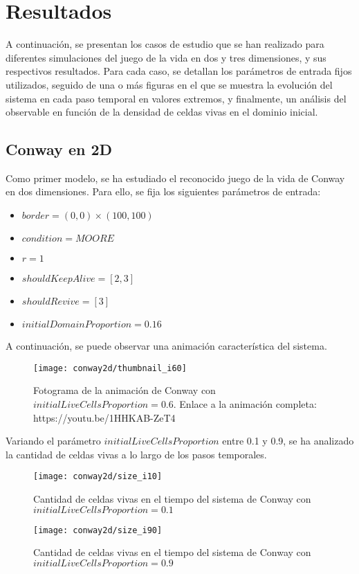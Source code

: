 \section{Resultados}\label{sec:resultados}
A continuación, se presentan los casos de estudio que se han realizado para diferentes simulaciones del juego
de la vida en dos y tres dimensiones, y sus respectivos resultados.
Para cada caso, se detallan los parámetros de entrada fijos utilizados, seguido de una o más figuras en el que
se muestra la evolución del sistema en cada paso temporal en valores extremos, y finalmente, un análisis del
observable en función de la densidad de celdas vivas en el dominio inicial.

\subsection{Conway en 2D}\label{subsec:conway-en-2d}

Como primer modelo, se ha estudiado el reconocido juego de la vida de Conway en dos dimensiones.
Para ello, se fija los siguientes parámetros de entrada:

\begin{itemize}
    \item $border = (0, 0) \times (100, 100)$
    \item $condition = MOORE$
    \item $r = 1$
    \item $shouldKeepAlive = [2, 3]$
    \item $shouldRevive = [3]$
    \item $initialDomainProportion = 0.16$
\end{itemize}

A continuación, se puede observar una animación característica del sistema.

\begin{figure}[H]
    \centering
    \texttt{[image: conway2d/thumbnail\_i60]}
    \caption{Fotograma de la animación de Conway con $initialLiveCellsProportion = 0.6$. Enlace a la animación completa: https://youtu.be/1HHKAB-ZeT4}
    \label{fig:thumbnailconway2d_i60}
\end{figure}

Variando el parámetro $initialLiveCellsProportion$ entre 0.1 y 0.9, se ha analizado la cantidad de celdas vivas
a lo largo de los pasos temporales.

\begin{figure}[H]
    \centering
    \texttt{[image: conway2d/size\_i10]}
    \caption{Cantidad de celdas vivas en el tiempo del sistema de Conway con $initialLiveCellsProportion = 0.1$}
    \label{fig:conway2d_i10}
\end{figure}
\begin{figure}[H]
    \centering
    \texttt{[image: conway2d/size\_i90]}
    \caption{Cantidad de celdas vivas en el tiempo del sistema de Conway con $initialLiveCellsProportion = 0.9$}
    \label{fig:conway2d_i90}
\end{figure}

